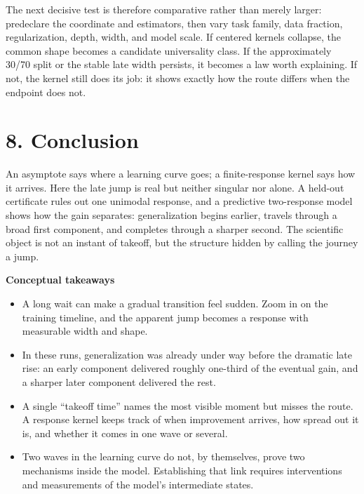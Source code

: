 \documentclass[10pt]{article}
\theoremstyle{compact}
\begin{document}
The next decisive test is therefore comparative rather than merely larger:
predeclare the coordinate and estimators, then vary task family, data fraction,
regularization, depth, width, and model scale. If centered kernels collapse,
the common shape becomes a candidate universality class. If the approximately
30/70 split or the stable late width persists, it becomes a law worth
explaining. If not, the kernel still does its job: it shows exactly how the
route differs when the endpoint does not.

\section*{8. Conclusion}

An asymptote says where a learning curve goes; a finite-response kernel says
how it arrives. Here the late jump is real but neither singular nor alone. A
held-out certificate rules out one unimodal response, and a predictive
two-response model shows how the gain separates: generalization begins earlier,
travels through a broad first component, and completes through a sharper second.
The scientific object is not an instant of takeoff, but the structure hidden by
calling the journey a jump.

\begin{questionbox}
\noindent\textcolor{questionink}{\bfseries Conceptual takeaways}
\begin{itemize}[
  leftmargin=1.45em,
  label=\textcolor{questionline}{\(\bullet\)},
  itemsep=0.35em,
  topsep=0.35em,
  parsep=0pt
]
\item A long wait can make a gradual transition feel sudden. Zoom in on the
training timeline, and the apparent jump becomes a response with measurable
width and shape.
\item In these runs, generalization was already under way before the dramatic
late rise: an early component delivered roughly one-third of the eventual
gain, and a sharper later component delivered the rest.
\item A single ``takeoff time'' names the most visible moment but misses the
route. A response kernel keeps track of when improvement arrives, how spread
out it is, and whether it comes in one wave or several.
\item Two waves in the learning curve do not, by themselves, prove two
mechanisms inside the model. Establishing that link requires interventions and
measurements of the model's intermediate states.
\end{itemize}
\end{questionbox}
\end{document}

